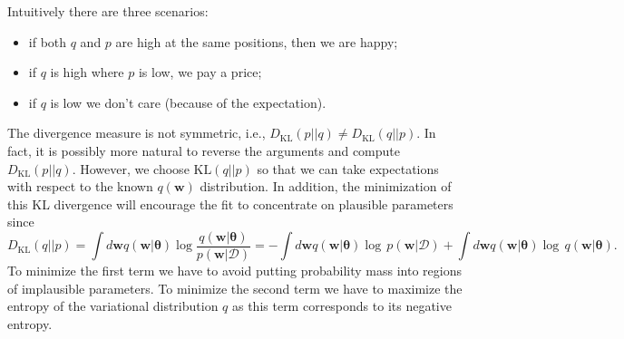 \documentclass[%
oneside,                 %
final,                   %
10pt]{article}
\begin{document}
Intuitively there are three scenarios:
\begin{itemize}
\item if both $q$ and $p$ are high at the same positions, then we are happy;

\item if $q$ is high where $p$ is low, we pay a price;

\item if $q$ is low we don't care (because of the expectation).
\end{itemize}

\noindent
The divergence measure is not symmetric, i.e., $D_\mathrm{KL}(p||q) \neq D_\mathrm{KL}(q||p)$. In fact, it is possibly more natural to reverse the arguments and compute $D_\mathrm{KL}(p||q)$. However, we choose $\mathrm{KL}(q||p)$ so that we can take expectations with respect to the known $q(\boldsymbol{w})$ distribution. In addition, the minimization of this KL divergence will encourage the fit to concentrate on plausible parameters since
\[
D_\mathrm{KL}(q||p) = \int d \boldsymbol{w} q(\boldsymbol{w}\lvert \boldsymbol{\theta}) \log \frac{q(\boldsymbol{w} \lvert \boldsymbol{\theta})}{p(\boldsymbol{w} \lvert \mathcal{D})} 
= -\int d \boldsymbol{w} q(\boldsymbol{w}\lvert \boldsymbol{\theta}) \log \, p(\boldsymbol{w} \lvert \mathcal{D}) + \int d \boldsymbol{w} q(\boldsymbol{w}\lvert \boldsymbol{\theta}) \log \, q(\boldsymbol{w} \lvert \boldsymbol{\theta}).
\]
To minimize the first term we have to avoid putting probability mass into regions of implausible parameters. To minimize the second term we have to maximize the entropy of the variational distribution $q$ as this term corresponds to its negative entropy.

\end{document}
